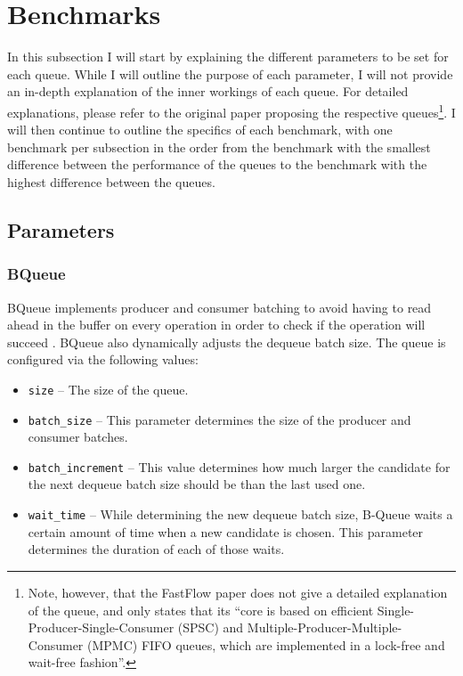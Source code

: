 \section{Benchmarks}
In this subsection I will start by explaining the different parameters to be set for each queue.
While I will outline the purpose of each parameter, I will not provide an in-depth explanation of the inner
workings of each queue.
For detailed explanations, please refer to the original paper proposing the respective queues\footnote{Note,
    however, that the FastFlow paper does not give a detailed explanation of the queue, and only states that its
    ``core is based on efficient Single-Producer-Single-Consumer (SPSC) and Multiple-Producer-Multiple-Consumer
(MPMC) FIFO queues, which are implemented in a lock-free and wait-free fashion''\cite{FastFlow}.}.
I will then continue to outline the specifics of each benchmark, with one benchmark per subsection in the
order from the benchmark with the smallest difference between the performance of the queues to the benchmark
with the highest difference between the queues.

\subsection{Parameters}
\subsubsection*{BQueue}
BQueue implements producer and consumer batching to avoid having to read ahead in the buffer on every
operation in order to check if the operation will succeed \cite{B-Queue}.
BQueue also dynamically adjusts the dequeue batch size.
The queue is configured via the following values:
\begin{itemize}
    \item \texttt{size} -- The size of the queue.
    \item \texttt{batch\_size} -- This parameter determines the size of the producer and consumer batches.
    \item \texttt{batch\_increment} -- This value determines how much larger the candidate for the next
        dequeue batch size should be than the last used one.
    \item \texttt{wait\_time} -- While determining the new dequeue batch size, B-Queue waits a certain amount
        of time when a new candidate is chosen. This parameter determines the duration of each of those waits.
\end{itemize}

